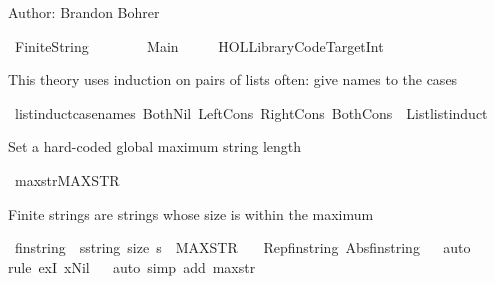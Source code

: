 \begin{isabellebody}
\begin{isamarkuptext}
    Author:     Brandon Bohrer%
\end{isamarkuptext}\isamarkuptrue%
%
\isadelimtheory
%
\endisadelimtheory
%
\isatagtheory
{}\isamarkupfalse%
\ {\isachardoublequoteopen}Finite{\isacharunderscore}String{\isachardoublequoteclose}\isanewline
\ \ \ \isanewline
\ \ \ \ Main\ \isanewline
\ \ \ \ {\isachardoublequoteopen}HOL{\isacharminus}Library{\isachardot}Code{\isacharunderscore}Target{\isacharunderscore}Int{\isachardoublequoteclose}\isanewline
{}%
\endisatagtheory
{\isafoldtheory}%
%
\isadelimtheory
%
\endisadelimtheory
%
\begin{isamarkuptext}%
This theory uses induction on pairs of lists often: give names to the cases%
\end{isamarkuptext}\isamarkuptrue%
\isamarkupfalse%
\ list{\isacharunderscore}induct{}{\isacharprime}{\isacharbrackleft}case{\isacharunderscore}names\ BothNil\ LeftCons\ RightCons\ BothCons{\isacharbrackright}\ {\isacharequal}\ List{\isachardot}list{\isacharunderscore}induct{}{\isacharprime}%
\begin{isamarkuptext}%
Set a hard-coded global maximum string length%
\end{isamarkuptext}\isamarkuptrue%
\isamarkupfalse%
\ max{\isacharunderscore}str{\isacharcolon}{\isachardoublequoteopen}MAX{\isacharunderscore}STR\ {\isacharequal}\ {}{}{\isachardoublequoteclose}%
\begin{isamarkuptext}%
Finite strings are strings whose size is within the maximum%
\end{isamarkuptext}\isamarkuptrue%
\isamarkupfalse%
\ fin{\isacharunderscore}string\ {\isacharequal}\ {\isachardoublequoteopen}{\isacharbraceleft}s{\isacharcolon}{\isacharcolon}string{\isachardot}\ size\ s\ {\isasymle}\ MAX{\isacharunderscore}STR{\isacharbraceright}{\isachardoublequoteclose}\isanewline
\ \ \ Rep{\isacharunderscore}fin{\isacharunderscore}string\ Abs{\isacharunderscore}fin{\isacharunderscore}string\isanewline
%
\isadelimproof
\ \ %
\endisadelimproof
%
\isatagproof
{}\isamarkupfalse%
{\isacharparenleft}auto{\isacharparenright}\isanewline
\ \ \isamarkupfalse%
{\isacharparenleft}rule\ exI{\isacharbrackleft}\ x{\isacharequal}Nil{\isacharbrackright}{\isacharparenright}\isanewline
\ \ \isamarkupfalse%
{\isacharparenleft}auto\ simp\ add{\isacharcolon}\ max{\isacharunderscore}str{\isacharparenright}%

\end{isabellebody}
